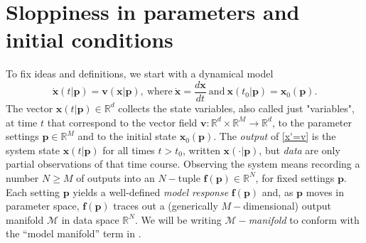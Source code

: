 







\section{Sloppiness in parameters and initial conditions}

To fix ideas and definitions, we start with a dynamical model
% 
\begin{equation}
  \dot{\mathbf{x}}(t \vert \mathbf{p})
  =
  \mathbf{v}(\mathbf{x} \vert \mathbf{p}) ,
  \ \mbox{where} \
  \dot{\mathbf{x}}
  =
  \frac{d\mathbf{x}}{dt}
  \ \mbox{and} \
  \mathbf{x}(t_0 \vert \mathbf{p}) = \mathbf{x}_0(\mathbf{p}) .
  \label{x'=v}
\end{equation}
% 
The vector $\mathbf{x}(t \vert \mathbf{p}) \in \mathbb{R}^d$ collects
the state variables, also called just "variables", at time $t$ that
correspond to the vector field
$\mathbf{v} : \mathbb{R}^d \times \mathbb{R}^M \to \mathbb{R}^d$, to
the parameter settings $\mathbf{p} \in \mathbb{R}^M$ and to the
initial state $\mathbf{x}_0(\mathbf{p})$.  The \emph{output} of
\eqref{x'=v} is the system state $\mathbf{x}(t \vert \mathbf{p})$ for
all times $t>t_0$, written $\mathbf{x}(\cdot\vert\mathbf{p})$, but
\emph{data} are only partial observations of that time course.
Observing the system means recording a number $N \ge M$ of outputs
into an $N-$tuple $\mathbf{f}(\mathbf{p}) \in \mathbb{R}^N$, for fixed
settings $\mathbf{p}$.  Each setting $\mathbf{p}$ yields a
well-defined \emph{model response} $\mathbf{f}(\mathbf{p})$ and, as
$\mathbf{p}$ moves in parameter space, $\mathbf{f}(\mathbf{p})$ traces
out a (generically $M-$dimensional) output manifold $\mathcal{M}$ in
data space $\mathbb{R}^N$.  We will be writing
$\mathcal{M}-$\emph{manifold} to conform with the ``model manifold''
term in \cite{TMS}.



